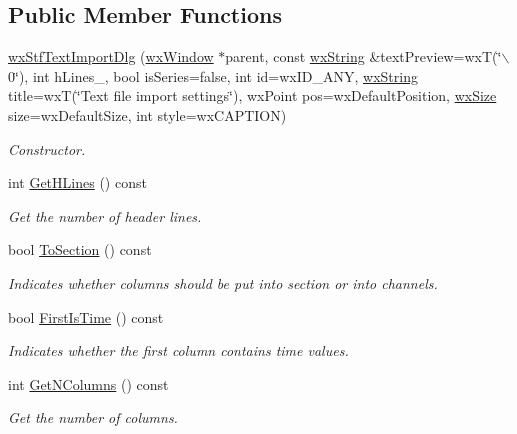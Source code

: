 \subsection*{Public Member Functions}
\begin{DoxyCompactItemize}
\item 
\hyperlink{classwxStfTextImportDlg_a3149a7952c4c97ed5224b6baf8b7b203}{wxStfTextImportDlg} (\hyperlink{classwxWindow}{wxWindow} $\ast$parent, const \hyperlink{classwxString}{wxString} \&textPreview=wxT(\char`\"{}$\backslash$0\char`\"{}), int hLines\_, bool isSeries=false, int id=wxID\_\-ANY, \hyperlink{classwxString}{wxString} title=wxT(\char`\"{}Text file import settings\char`\"{}), wxPoint pos=wxDefaultPosition, \hyperlink{classwxSize}{wxSize} size=wxDefaultSize, int style=wxCAPTION)
\begin{DoxyCompactList}\small\item\em Constructor. \item\end{DoxyCompactList}\item 
int \hyperlink{classwxStfTextImportDlg_a40cff4ce03776e0a33c59e81f20fce75}{GetHLines} () const 
\begin{DoxyCompactList}\small\item\em Get the number of header lines. \item\end{DoxyCompactList}\item 
bool \hyperlink{classwxStfTextImportDlg_a68a7e397325e3637b17a2fb12734cf2b}{ToSection} () const 
\begin{DoxyCompactList}\small\item\em Indicates whether columns should be put into section or into channels. \item\end{DoxyCompactList}\item 
bool \hyperlink{classwxStfTextImportDlg_a28a803494a77165c093c6bf6a7f81f2c}{FirstIsTime} () const 
\begin{DoxyCompactList}\small\item\em Indicates whether the first column contains time values. \item\end{DoxyCompactList}\item 
int \hyperlink{classwxStfTextImportDlg_ae7b9bf7d51979873b04b609a00dfa321}{GetNColumns} () const 
\begin{DoxyCompactList}\small\item\em Get the number of columns. \item\end{DoxyCompactList}\item 

\end{DoxyCompactItemize}
